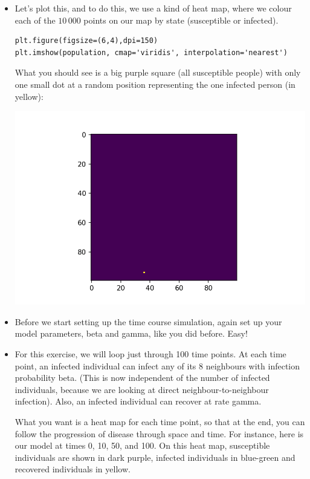 \documentclass[pdflatex,a4paper]{article}
\begin{document}
\begin{itemize}
\item
Let's plot this, and to do this, we use a kind of heat map, where we colour each of the \(10\,000\) points on our map by state (susceptible or infected).  

\begin{lstlisting}
plt.figure(figsize=(6,4),dpi=150)   
plt.imshow(population, cmap='viridis', interpolation='nearest')
\end{lstlisting}

What you should see is a big purple square (all susceptible people) with only one small dot at a random position representing the one infected person (in yellow):

\includegraphics{spatial_SIR0.png}

\item

Before we start setting up the time course simulation, again set up your model parameters, beta and gamma, like you did before. Easy!

\item

For this exercise, we will loop just through 100 time points. At each time point, an infected individual can infect any of its 8 neighbours with infection probability beta. (This is now independent of the number of infected individuals, because we are looking at direct neighbour-to-neighbour infection). Also, an infected individual can recover at rate gamma.

What you want is a heat map for each time point, so that at the end, you can follow the progression of disease through space and time. For instance, here is our model at times 0, 10, 50, and 100. On this heat map, susceptible individuals are shown in dark purple, infected individuals in blue-green and recovered individuals in yellow.
 

\end{itemize}
\end{document}

